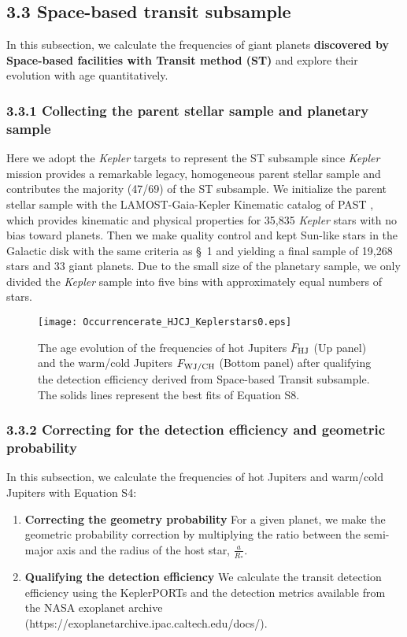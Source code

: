 \documentclass[twocolumn]{pnas-new}
\begin{document}
\subsection*{3.3 Space-based transit subsample}
\label{sec.obs.SBTS}
In this subsection, we calculate the frequencies of giant planets \textbf{discovered by Space-based facilities with Transit method (ST)} and explore their evolution with age quantitatively.

\subsubsection*{3.3.1 Collecting the parent stellar sample and planetary sample}
\label{sec.obs.SBTS.sample}
Here we adopt the {\it Kepler} targets to represent the ST subsample since {\it Kepler} mission provides a remarkable legacy, homogeneous parent stellar sample and contributes the majority (47/69) of the ST subsample.
We initialize the parent stellar sample with the LAMOST-Gaia-Kepler Kinematic catalog of PAST \uppercase\expandafter{} \citep{2021AJ....162..100C}, which provides kinematic and physical properties for 35,835 {\it Kepler} stars with no bias toward planets.
Then we make quality control and kept Sun-like stars in the Galactic disk with the same criteria as \S~1 and yielding a final sample of 19,268 stars and 33 giant planets.
Due to the small size of the planetary sample, we only divided the {\it Kepler} sample into five bins with approximately equal numbers of stars.

\begin{figure}[!t]
\centering
\texttt{[image: Occurrencerate\_HJCJ\_Keplerstars0.eps]}
\caption{The age evolution of the frequencies of hot Jupiters $F_{\rm HJ}$ (Up panel) and the warm/cold Jupiters $F_{\rm WJ/CH}$ (Bottom panel) after qualifying the detection efficiency derived from Space-based Transit subsample.
The solids lines represent the best fits of Equation S8.
\label{figKeplerOccurrencerateDE}}
\end{figure}

\subsubsection*{3.3.2 Correcting for the detection efficiency and geometric probability}
\label{sec.obs.SBTS.Debias}
In this subsection, we calculate the frequencies of hot Jupiters and warm/cold Jupiters with Equation S4:
\begin{enumerate}
  \item \textbf{Correcting the geometry probability} 
  For a given planet, we make the geometric probability correction by multiplying the ratio between the semi-major axis and the radius of the host star, $\frac{a}{R_*}$.
   
  \item \textbf{Qualifying the detection efficiency} 
  We calculate the transit detection efficiency using the KeplerPORTs \citep{2017ksci.rept...17B} and the detection
  metrics available from the NASA exoplanet archive (https://exoplanetarchive.ipac.caltech.edu/docs/). 
\end{enumerate}
\end{document}
